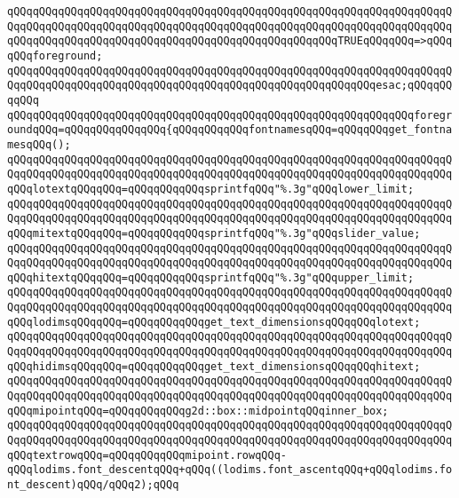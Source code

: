 \verb|qQQqqQQqqQQqqQQqqQQqqQQqqQQqqQQqqQQqqQQqqQQqqQQqqQQqqQQqqQQqqQQqqQQqqQQqqQQqqQQqqQQqqQQqqQQqqQQqqQQqqQQqqQQqqQQqqQQqqQQqqQQqqQQqqQQqqQQqqQQqqQQqqQQqqQQqqQQqqQQqqQQqqQQqqQQqqQQqqQQqqQQqqQQqqQQqTRUEqQQqqQQq=>qQQqqQQqforeground;|\newline
\verb|qQQqqQQqqQQqqQQqqQQqqQQqqQQqqQQqqQQqqQQqqQQqqQQqqQQqqQQqqQQqqQQqqQQqqQQqqQQqqQQqqQQqqQQqqQQqqQQqqQQqqQQqqQQqqQQqqQQqqQQqqQQqqQQqesac;qQQqqQQqqQQq|\newline
\newline
\newline
\verb|qQQqqQQqqQQqqQQqqQQqqQQqqQQqqQQqqQQqqQQqqQQqqQQqqQQqqQQqqQQqqQQqforegroundqQQq=qQQqqQQqqQQqqQQq{qQQqqQQqqQQqfontnamesqQQq=qQQqqQQqget_fontnamesqQQq();|\newline
\newline
\verb|qQQqqQQqqQQqqQQqqQQqqQQqqQQqqQQqqQQqqQQqqQQqqQQqqQQqqQQqqQQqqQQqqQQqqQQqqQQqqQQqqQQqqQQqqQQqqQQqqQQqqQQqqQQqqQQqqQQqqQQqqQQqqQQqqQQqqQQqqQQqqQQqlotextqQQqqQQq=qQQqqQQqqQQqsprintfqQQq"%.3g"qQQqlower_limit;|\newline
\verb|qQQqqQQqqQQqqQQqqQQqqQQqqQQqqQQqqQQqqQQqqQQqqQQqqQQqqQQqqQQqqQQqqQQqqQQqqQQqqQQqqQQqqQQqqQQqqQQqqQQqqQQqqQQqqQQqqQQqqQQqqQQqqQQqqQQqqQQqqQQqqQQqmitextqQQqqQQq=qQQqqQQqqQQqsprintfqQQq"%.3g"qQQqslider_value;|\newline
\verb|qQQqqQQqqQQqqQQqqQQqqQQqqQQqqQQqqQQqqQQqqQQqqQQqqQQqqQQqqQQqqQQqqQQqqQQqqQQqqQQqqQQqqQQqqQQqqQQqqQQqqQQqqQQqqQQqqQQqqQQqqQQqqQQqqQQqqQQqqQQqqQQqhitextqQQqqQQq=qQQqqQQqqQQqsprintfqQQq"%.3g"qQQqupper_limit;|\newline
\newline
\verb|qQQqqQQqqQQqqQQqqQQqqQQqqQQqqQQqqQQqqQQqqQQqqQQqqQQqqQQqqQQqqQQqqQQqqQQqqQQqqQQqqQQqqQQqqQQqqQQqqQQqqQQqqQQqqQQqqQQqqQQqqQQqqQQqqQQqqQQqqQQqqQQqlodimsqQQqqQQq=qQQqqQQqqQQqget_text_dimensionsqQQqqQQqlotext;|\newline
\verb|qQQqqQQqqQQqqQQqqQQqqQQqqQQqqQQqqQQqqQQqqQQqqQQqqQQqqQQqqQQqqQQqqQQqqQQqqQQqqQQqqQQqqQQqqQQqqQQqqQQqqQQqqQQqqQQqqQQqqQQqqQQqqQQqqQQqqQQqqQQqqQQqhidimsqQQqqQQq=qQQqqQQqqQQqget_text_dimensionsqQQqqQQqhitext;|\newline
\newline
\verb|qQQqqQQqqQQqqQQqqQQqqQQqqQQqqQQqqQQqqQQqqQQqqQQqqQQqqQQqqQQqqQQqqQQqqQQqqQQqqQQqqQQqqQQqqQQqqQQqqQQqqQQqqQQqqQQqqQQqqQQqqQQqqQQqqQQqqQQqqQQqqQQqmipointqQQq=qQQqqQQqqQQqg2d::box::midpointqQQqinner_box;|\newline
\newline
\verb|qQQqqQQqqQQqqQQqqQQqqQQqqQQqqQQqqQQqqQQqqQQqqQQqqQQqqQQqqQQqqQQqqQQqqQQqqQQqqQQqqQQqqQQqqQQqqQQqqQQqqQQqqQQqqQQqqQQqqQQqqQQqqQQqqQQqqQQqqQQqqQQqtextrowqQQq=qQQqqQQqqQQqmipoint.rowqQQq-qQQqlodims.font_descentqQQq+qQQq((lodims.font_ascentqQQq+qQQqlodims.font_descent)qQQq/qQQq2);qQQq|\newline
